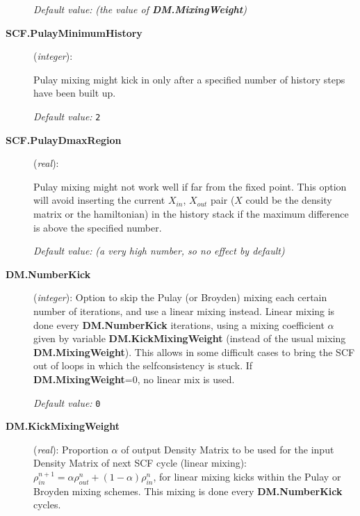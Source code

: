 \documentclass[11pt]{article}
\begin{document}
\begin{description}
{\it Default value:} {\it (the value of {\bf DM.MixingWeight})}

\item[{\bf SCF.PulayMinimumHistory}] ({\it integer}):

Pulay mixing might kick in only after a specified number of history
steps have been built up.

{\it Default value:} {\tt 2}

\item[{\bf SCF.PulayDmaxRegion}] ({\it real}):

Pulay mixing might not work well if far from the fixed point. This option
will avoid inserting the current $X_{in}$, $X_{out}$ pair ($X$ could be
the density matrix or the hamiltonian) in the history stack if
the maximum difference is above the specified number.

{\it Default value:} {\it (a very high number, so no effect by
  default)}

\item[{\bf DM.NumberKick}] ({\it integer}):
Option to skip the Pulay (or Broyden) mixing each certain number of iterations,
and use a linear mixing instead. Linear mixing is done
every {\bf DM.NumberKick} iterations, using a mixing coefficient
$\alpha$ given by variable {\bf DM.KickMixingWeight}
(instead of the usual mixing {\bf DM.MixingWeight}).
This allows in some difficult cases to bring the SCF out of
loops in which the selfconsistency is stuck.
If {\bf DM.MixingWeight}=0, no linear mix is used.

{\it Default value:} {\tt 0}

\item[{\bf DM.KickMixingWeight}] ({\it real}):
Proportion $\alpha$ of
output Density Matrix to be used for the input Density Matrix of
next SCF cycle (linear mixing):
$\rho^{n+1}_{in} = \alpha \rho^{n}_{out}
+(1 - \alpha) \rho^{n}_{in}$, for linear mixing kicks within the
Pulay or Broyden mixing schemes.
This mixing is done every {\bf DM.NumberKick} cycles.


\end{description}
\end{document}
